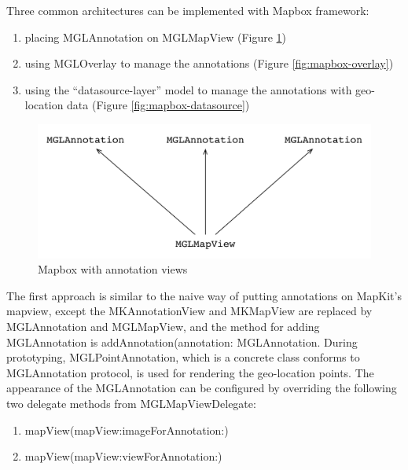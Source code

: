 \documentclass[12pt,a4paper]{article}
\renewcommand\texttt[1]{{\ttfamily\color{textttColor}#1}}
\begin{document}
                Three common architectures can be implemented with Mapbox framework:
                \begin{enumerate}
                    \setlength\itemsep{-0.5em}
                    \item placing \texttt{MGLAnnotation} on \texttt{MGLMapView} (Figure \ref{fig:mapbox-annotation})
                    \item using \texttt{MGLOverlay} to manage the annotations (Figure \ref{fig:mapbox-overlay})
                    \item using the ``datasource-layer'' model to manage the annotations with geo-location data (Figure \ref{fig:mapbox-datasource})
                \end{enumerate}
                
                \begin{figure}
                    \includegraphics[width=\textwidth]{4-1-2-2-a}
                    \centering
                    \caption{Mapbox with annotation views}
                    \label{fig:mapbox-annotation}
                \end{figure}
                
                The first approach is similar to the naive way of putting annotations on MapKit's mapview, except the \texttt{MKAnnotationView} and \texttt{MKMapView} are replaced by \texttt{MGLAnnotation} and \texttt{MGLMapView}, and the method for adding \texttt{MGLAnnotation} is \texttt{addAnnotation(annotation: MGLAnnotation}. During prototyping, \texttt{MGLPointAnnotation}, which is a concrete class conforms to \texttt{MGLAnnotation} protocol, is used for rendering the geo-location points. The appearance of the \texttt{MGLAnnotation} can be configured by overriding the following two delegate methods from \texttt{MGLMapViewDelegate}:
                \begin{enumerate}
                    \setlength\itemsep{-0.5em}
                    \item \texttt{mapView(mapView:imageForAnnotation:)}
                    \item \texttt{mapView(mapView:viewForAnnotation:)}
                \end{enumerate}
                
\end{document}
